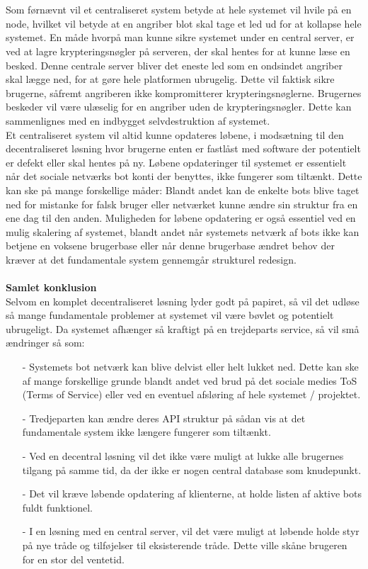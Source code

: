 \\\\
Som førnævnt vil et centraliseret system betyde at hele systemet vil hvile på en node, hvilket vil betyde at en angriber blot skal tage et led ud for at kollapse hele systemet. En måde hvorpå man kunne sikre systemet under en central server, er ved at lagre krypteringsnøgler på serveren, der skal hentes for at kunne læse en besked. Denne centrale server bliver det eneste led som en ondsindet angriber skal lægge ned, for at gøre hele platformen ubrugelig. Dette vil faktisk sikre brugerne, såfremt angriberen ikke kompromitterer krypteringsnøglerne. Brugernes beskeder vil være ulæselig for en angriber uden de krypteringsnøgler. Dette kan sammenlignes med en indbygget selvdestruktion af systemet.\\
Et centraliseret system vil altid kunne opdateres løbene, i modsætning til den decentraliseret løsning hvor brugerne enten er fastlåst med software der potentielt er defekt eller skal hentes på ny. Løbene opdateringer til systemet er essentielt når det sociale netværks bot konti der benyttes, ikke fungerer som tiltænkt. Dette kan ske på mange forskellige måder: Blandt andet kan de enkelte bots blive taget ned for mistanke for falsk bruger eller netværket kunne ændre sin struktur fra en ene dag til den anden. Muligheden for løbene opdatering er også essentiel ved en mulig skalering af systemet, blandt andet når systemets netværk af bots ikke kan betjene en voksene brugerbase eller når denne brugerbase ændret behov der kræver at det fundamentale system gennemgår strukturel redesign.
\\\\
\textbf{Samlet konklusion}\\
Selvom en komplet decentraliseret løsning lyder godt på papiret, så vil det udløse så mange fundamentale problemer at systemet vil være bøvlet og potentielt ubrugeligt. Da systemet afhænger så kraftigt på en trejdeparts service, så vil små ændringer så som:
\begin{itemize}
    \item[-] Systemets bot netværk kan blive delvist eller helt lukket ned. Dette kan ske af mange forskellige grunde blandt andet ved brud på det sociale medies ToS (Terms of Service) eller ved en eventuel afsløring af hele systemet / projektet. 
    \item[-] Tredjeparten kan ændre deres API struktur på sådan vis at det fundamentale system ikke længere fungerer som tiltænkt.
    \item[-] Ved en decentral løsning vil det ikke være muligt at lukke alle brugernes tilgang på samme tid, da der ikke er nogen central database som knudepunkt.
    \item[-] Det vil kræve løbende opdatering af klienterne, at holde listen af aktive bots fuldt funktionel.
    \item[-] I en løsning med en central server, vil det være muligt at løbende holde styr på nye tråde og tilføjelser til eksisterende tråde. Dette ville skåne brugeren for en stor del ventetid.  
\end{itemize}

